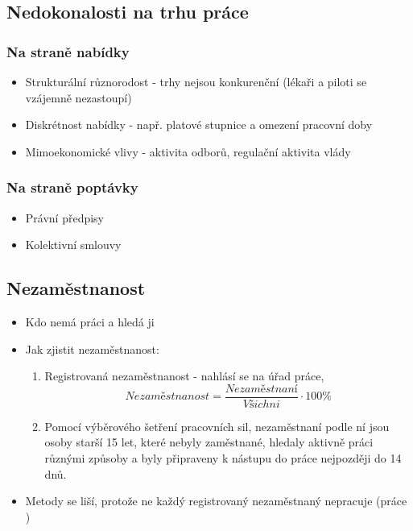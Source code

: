 \subsection{Nedokonalosti na trhu práce}
\subsubsection{Na straně nabídky}
\begin{itemize}
    \item Strukturální různorodost - trhy nejsou konkurenční (lékaři a piloti se vzájemně nezastoupí)
    \item Diskrétnost nabídky - např. platové stupnice a omezení pracovní doby
    \item Mimoekonomické vlivy - aktivita odborů, regulační aktivita vlády
\end{itemize}
\subsubsection{Na straně poptávky}
\begin{itemize}
    \item Právní předpisy
    \item Kolektivní smlouvy
\end{itemize}

\subsection{Nezaměstnanost}
\begin{itemize}
    \item Kdo nemá práci a hledá ji
    \item Jak zjistit nezaměstnanost:
    \begin{enumerate}
        \item Registrovaná nezaměstnanost - nahlásí se na úřad práce,\\
        $$ Nezaměstnanost= \frac{Nezaměstnaní}{Všichni} \cdot 100 \% $$
        \item Pomocí výběrového šetření pracovních sil, nezaměstnaní podle ní jsou osoby starší 15 let, které nebyly zaměstnané, hledaly aktivně práci různými způsoby a byly připraveny k nástupu do práce nejpozději do 14 dnů.
    \end{enumerate}
    \item Metody se liší, protože ne každý registrovaný nezaměstnaný nepracuje (práce ) 
\end{itemize}